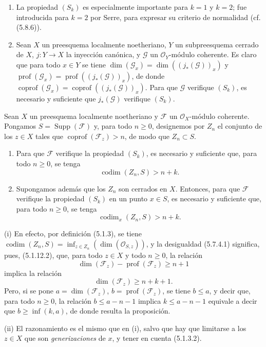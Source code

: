 \begin{remarks}[5.7.3]
\begin{enumerate}
\item[(v)] La propiedad $(S_k)$ es especialmente importante para $k=1$ y
$k=2$; fue introducida para $k=2$ por Serre, para expresar su criterio de
normalidad (cf. (5.8.6)).

\item[(vi)] Sean $X$ un preesquema localmente noetheriano, $Y$ un
subpreesquema cerrado de $X$, $j:Y\to X$ la inyección canónica, y
$\mathscr G$ un $\mathcal O_Y$-módulo coherente. Es claro que para todo
$x\in Y$ se tiene
$\dim(\mathscr G_x)=\dim((j_*(\mathscr G))_x)$ y
$\operatorname{prof}(\mathscr G_x)=\operatorname{prof}((j_*(\mathscr G))_x)$,
de donde
$\operatorname{coprof}(\mathscr G_x)=\operatorname{coprof}((j_*(\mathscr G))_x)$.
Para que $\mathscr G$ verifique $(S_k)$, es necesario y suficiente que
$j_*(\mathscr G)$ verifique $(S_k)$.
\end{enumerate}
\end{remarks}

\begin{proposition}[5.7.4]
\label{IV.2.s5.7.4-fr}
Sean $X$ un preesquema localmente noetheriano y $\mathscr F$ un
$\mathcal O_X$-módulo coherente. Pongamos
$S=\operatorname{Supp}(\mathscr F)$ y, para todo $n\geq0$, designemos por
$Z_n$ el conjunto de los $z\in X$ tales que
$\operatorname{coprof}(\mathscr F_z)>n$, de modo que $Z_n\subset S$.
\begin{enumerate}
\item[\textup{(i)}] Para que $\mathscr F$ verifique la propiedad $(S_k)$, es necesario
y suficiente que, para todo $n\geq0$, se tenga
\begin{equation}
\operatorname{codim}(Z_n,S)>n+k.
\tag{5.7.4.1}\label{IV.2.s5.7.4.1-fr}
\end{equation}
\item[\textup{(ii)}] Supongamos además que los $Z_n$ son cerrados en $X$. Entonces,
para que $\mathscr F$ verifique la propiedad $(S_k)$ en un punto $x\in S$, es
necesario y suficiente que, para todo $n\geq0$, se tenga
\begin{equation}
\operatorname{codim}_x(Z_n,S)>n+k.
\tag{5.7.4.2}\label{IV.2.s5.7.4.2-fr}
\end{equation}
\end{enumerate}
\end{proposition}

(i) En efecto, por definición (5.1.3), se tiene
$\operatorname{codim}(Z_n,S)=\inf_{z\in Z_n}(\dim(\mathcal O_{S,z}))$, y la
desigualdad (5.7.4.1) significa, pues, (5.1.12.2), que, para todo $z\in X$ y
todo $n\geq0$, la relación
\[
\dim(\mathscr F_z)-\operatorname{prof}(\mathscr F_z)\geq n+1
\]
implica la relación
\[
\dim(\mathscr F_z)\geq n+k+1.
\]
Pero, si se pone $a=\dim(\mathscr F_z)$,
$b=\operatorname{prof}(\mathscr F_z)$, se tiene $b\leq a$, y decir que, para
todo $n\geq0$, la relación $b\leq a-n-1$ implica $k\leq a-n-1$ equivale a
decir que $b\geq\inf(k,a)$, de donde resulta la proposición.


(ii) El razonamiento es el mismo que en (i), salvo que hay que limitarse a
los $z\in X$ que son \emph{generizaciones} de $x$, y tener en cuenta (5.1.3.2).

